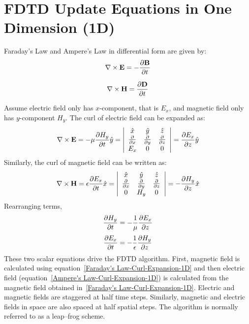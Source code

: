 \documentclass{report}
\begin{document}
\section{FDTD Update Equations in One Dimension (1D)}
Faraday's Law and Ampere's Law in differential form are given by:
\begin{equation}
\centering
\nabla \times \textbf{E} = - \dfrac{\partial \textbf{B}}{\partial t}
\label{Faraday's Law}
\end{equation}

\begin{equation}
\centering
\nabla \times \textbf{H} = \dfrac{\partial \textbf{D}}{\partial t}
\label{Ampere's Law}
\end{equation}

Assume electric field only has $x$-component, that is $E_x$, and magnetic field only has $y$-component $H_y$. The curl of electric field can be expanded as:
\begin{equation}
\centering
\nabla \times \textbf{E} = - \mu \dfrac{\partial H_y}{\partial t} \hat{y} = \left| \begin{array}{ccc} \hat{x} & \hat{y} & \hat{z} \\ \frac{\partial}{\partial x} & \frac{\partial}{\partial y} & \frac{\partial}{\partial z} \\ E_x & 0 & 0 \end{array} \right| = \dfrac{\partial E_x}{\partial z} \hat{y}
\label{Faraday's Law-Curl-Expansion}
\end{equation}
Similarly, the curl of magnetic field can be written as:
\begin{equation}
\centering
\nabla \times \textbf{H} = \epsilon \dfrac{\partial E_x}{\partial t} \hat{x} = \left| \begin{array}{ccc} \hat{x} & \hat{y} & \hat{z} \\ \frac{\partial}{\partial x} & \frac{\partial}{\partial y} & \frac{\partial}{\partial z} \\ 0 & H_y & 0 \end{array} \right| = - \dfrac{\partial H_y}{\partial z} \hat{x}
\label{Ampere's Law-Curl-Expansion}
\end{equation}
Rearranging terms,
\begin{equation}
\centering
\dfrac{\partial H_y}{\partial t} = - \dfrac{1}{\mu} \dfrac{\partial E_x}{\partial z}
\label{Faraday's Law-Curl-Expansion-1D}
\end{equation}
\begin{equation}
\centering
\dfrac{\partial E_x}{\partial t} = - \dfrac{1}{\epsilon} \dfrac{\partial H_y}{\partial z}
\label{Ampere's Law-Curl-Expansion-1D}
\end{equation}
These two scalar equations drive the FDTD algorithm. First, magnetic field is calculated using equation~\ref{Faraday's Law-Curl-Expansion-1D} and then electric field (equation~\ref{Ampere's Law-Curl-Expansion-1D}) is calculated from the magnetic field obtained in~\ref{Faraday's Law-Curl-Expansion-1D}. Electric and magnetic fields are staggered at half time steps. Similarly, magnetic and electric fields in space are also spaced at half spatial steps. The algorithm is normally referred to as a leap--frog scheme.
\end{document}

